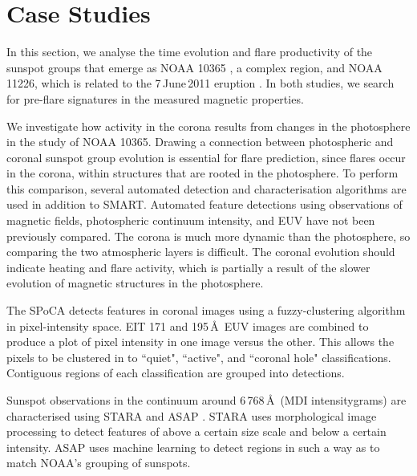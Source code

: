                                                                                                                                                                                                                                                                                                                                                                                                                                                                                                     
\section{Case Studies}\label{sect:casestudies}

In this section, we analyse the time evolution and flare productivity of the sunspot groups that emerge as NOAA 10365 \citep{Verbeeck:2011}, a complex region, and NOAA 11226, which is related to the 7\,June\,2011 eruption \citep{Bloomfield:2012b}.  In both studies, we search for pre-flare signatures in the measured magnetic properties. 

We investigate how activity in the corona results from changes in the photosphere in the study of NOAA 10365. Drawing a connection between photospheric and coronal sunspot group evolution is essential for flare prediction, since flares occur in the corona, within structures that are rooted in the photosphere. To perform this comparison, several automated detection and characterisation algorithms are used in addition to \gls{SMART}. Automated feature detections using observations of magnetic fields, photospheric continuum intensity, and \gls{EUV} have not been previously compared. The corona is much more dynamic than the photosphere, so comparing the two atmospheric layers is difficult. The coronal evolution should indicate heating and flare activity, which is partially a result of the slower evolution of magnetic structures in the photosphere.

The \gls{SPoCA} detects features in coronal images \citep{Barra:2009} using a fuzzy-clustering algorithm in pixel-intensity space. \gls{EIT} 171 and 195\,\AA\ \gls{EUV} images are combined to produce a plot of pixel intensity in one image versus the other. This allows the pixels to be clustered in to ``quiet", ``active", and ``coronal hole" classifications. Contiguous regions of each classification are grouped into detections. 

Sunspot observations in the continuum around 6\,768\,\AA\ (\gls{MDI} intensitygrams) are characterised using \gls{STARA} \citep{Watson:2009} and \gls{ASAP} \citep{Colak:2009}. \gls{STARA} uses morphological image processing to detect features of above a certain size scale and below a certain intensity. \gls{ASAP} uses machine learning to detect regions in such a way as to match NOAA's grouping of sunspots. 

